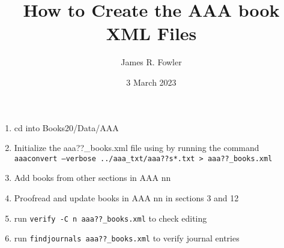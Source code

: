 \documentclass{article}
\begin{document}
\title{How to Create the AAA book XML Files}
\author{James R. Fowler}
\date{3 March 2023}

\maketitle

\begin{enumerate}
  \item cd into Books20/Data/AAA
\item Initialize the aaa??\_books.xml file using by running the
  command \\
  \texttt{aaaconvert --verbose ../aaa\_txt/aaa??s*.txt > aaa??\_books.xml}

\item Add books from other sections in AAA nn

\item Proofread and update books in AAA nn in sections 3 and 12

\item run \texttt{verify -C n aaa??\_books.xml} to check editing

  \item run \texttt{findjournals aaa??\_books.xml} to verify journal entries

\end{enumerate}
\end{document}
